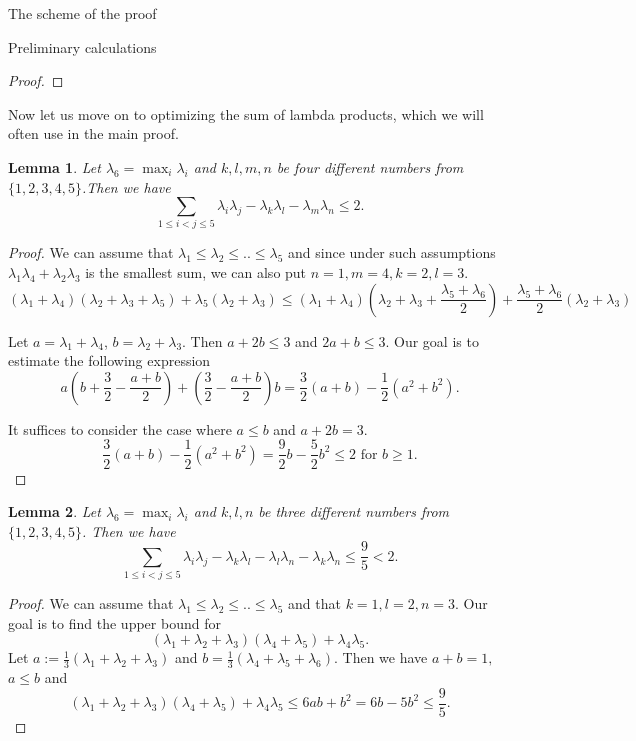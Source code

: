 \documentclass[12pt]{article}
\newtheorem{lemma}{Lemma}[section]
\begin{document}
\begin{section}{The scheme of the proof}
\begin{section}{Preliminary calculations}
\begin{proof}
    \end{proof}
    
    Now let us move on to optimizing the sum of lambda products, which we will often use in the main proof. 
    
   
    \begin{lemma}
    \label{lemma-2}
        Let $\lambda_{6} = \max_{i}\lambda_{i}$ and $k,l,m,n$ be four different  numbers from $\{1,2,3,4,5\}$.Then we have 
        $$
            \sum_{1\leq i<j\leq 5}\lambda_{i}\lambda_{j} - \lambda_{k}\lambda_{l} - \lambda_{m}\lambda_{n}\leq 2.
        $$
    \end{lemma}
    
    \begin{proof}
        We can assume that $\lambda_{1}\leq \lambda_{2}\leq .. \leq \lambda_{5}$ and since under such  assumptions $\lambda_{1}\lambda_{4} + \lambda_{2}\lambda_{3}$ is the smallest sum, we can also put $n=1,m=4,k=2,l=3$. 
         $$
            (\lambda_{1} + \lambda_{4})(\lambda_{2}+\lambda_{3} + \lambda_{5}) + \lambda_{5}(\lambda_{2} + \lambda_{3}) \leq (\lambda_{1} + \lambda_{4})\left(\lambda_{2}+\lambda_{3} + \frac{\lambda_{5}+\lambda_{6}}{2}\right) + \frac{\lambda_{5}+\lambda_{6}}{2}(\lambda_{2} + \lambda_{3})  
    $$

    Let $a = \lambda_{1} + \lambda_{4}$, $b = \lambda_{2} + \lambda_{3}$. Then $a+2b\leq 3$ and $2a+b\leq 3$. Our goal is to estimate the following expression
    $$
        a\left(b+\frac{3}{2} - \frac{a+b}{2}\right) + \left(\frac{3}{2} - \frac{a+b}{2}\right)b = \frac{3}{2}(a+b) - \frac{1}{2}(a^{2}+b^{2}).
    $$

    It suffices to consider the case where $a\leq b$ and $a+2b = 3$.  
    $$
        \frac{3}{2}(a+b) - \frac{1}{2}(a^{2}+b^{2}) = \frac{9}{2}b - \frac{5}{2}b^2\leq 2 \text{ for $b\geq 1$.}
    $$
    \end{proof}
    
    \begin{lemma}
    \label{lemma3.4}
        Let $\lambda_{6} = \max_{i}\lambda_{i}$ and $k,l,n$ be three different  numbers from $\{1,2,3,4,5\}$. Then we have 
        $$
            \sum_{1\leq i<j\leq 5}\lambda_{i}\lambda_{j} - \lambda_{k}\lambda_{l} - \lambda_{l}\lambda_{n} - \lambda_{k}\lambda_{n}\leq \frac{9}{5} < 2.
        $$
    \end{lemma}
    
    \begin{proof}
        We can assume that $\lambda_{1}\leq \lambda_{2}\leq .. \leq \lambda_{5}$ and that $k=1, l=2, n=3$. Our goal is to find the upper bound for 
        $$          (\lambda_{1}+\lambda_{2}+\lambda_{3})(\lambda_{4}+\lambda_{5}) + \lambda_{4}\lambda_{5}.
        $$
        Let $a := \frac{1}{3}(\lambda_{1} + \lambda_{2} + \lambda_{3})$ and $b = \frac{1}{3}(\lambda_{4} + \lambda_{5} + \lambda_{6})$. Then we have $a + b = 1 ,$ $a\leq b$ and 
        $$
            (\lambda_{1}+\lambda_{2}+\lambda_{3})(\lambda_{4}+\lambda_{5}) + \lambda_{4}\lambda_{5} \leq 6ab + b^2 = 6b - 5b^2 \leq \frac{9}{5}.
        $$
       

\end{proof}
\end{section}
\end{section}
\end{document}
